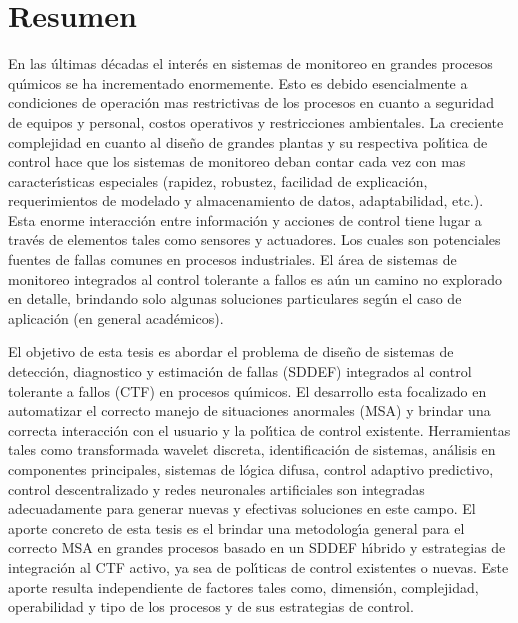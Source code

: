 \chapter*{Resumen}
En las {\'u}ltimas d{\'e}cadas el inter{\'e}s en sistemas de monitoreo en grandes procesos qu{\'\i}micos se ha incrementado
enormemente. Esto es debido esencialmente a condiciones de operaci{\'o}n mas restrictivas de los procesos en
cuanto a seguridad de equipos y personal, costos operativos y restricciones ambientales. La creciente
complejidad en cuanto al dise{\~n}o de grandes plantas y su respectiva pol{\'\i}tica de control hace que los sistemas
de monitoreo deban contar cada vez con mas caracter{\'\i}sticas especiales (rapidez, robustez, facilidad de
explicaci{\'o}n, requerimientos de modelado y almacenamiento de datos, adaptabilidad, etc.). Esta enorme
interacci{\'o}n entre informaci{\'o}n y acciones de control tiene lugar a trav{\'e}s de elementos tales como sensores y
actuadores. Los cuales son potenciales fuentes de fallas comunes en procesos industriales. El {\'a}rea de
sistemas de monitoreo integrados al control tolerante a fallos es a{\'u}n un camino no explorado en detalle,
brindando solo algunas soluciones particulares seg{\'u}n el caso de aplicaci{\'o}n (en general acad{\'e}micos).

El objetivo de esta tesis es abordar el problema de dise{\~n}o de sistemas de detecci{\'o}n, diagnostico y
estimaci{\'o}n de fallas (SDDEF) integrados al control tolerante a fallos (CTF) en procesos qu{\'\i}micos. El
desarrollo esta focalizado en automatizar el correcto manejo de situaciones anormales (MSA) y brindar una
correcta interacci{\'o}n con el usuario y la pol{\'\i}tica de control existente. Herramientas tales como transformada
wavelet discreta, identificaci{\'o}n de sistemas, an{\'a}lisis en componentes principales, sistemas de l{\'o}gica
difusa, control adaptivo predictivo, control descentralizado y redes neuronales artificiales son integradas
adecuadamente para generar nuevas y efectivas soluciones en este campo. El aporte concreto de esta tesis es
el brindar una metodolog{\'\i}a general para el correcto MSA en grandes procesos basado en un SDDEF h{\'\i}brido y
estrategias de integraci{\'o}n al CTF activo, ya sea de pol{\'\i}ticas de control existentes o nuevas. Este aporte
resulta independiente de factores tales como, dimensi{\'o}n, complejidad, operabilidad y tipo de los procesos y
de sus estrategias de control.


